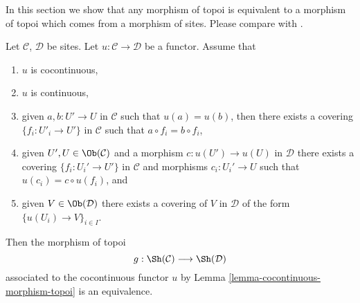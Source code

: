 \noindent
In this section we show that any morphism of topoi is equivalent
to a morphism of topoi which comes from a morphism of sites.
Please compare with \cite[Expos\'e IV, Proposition 4.9.4]{SGA4}.

\begin{lemma}
\label{lemma-equivalence}
Let $\mathcal{C}$, $\mathcal{D}$ be sites.
Let $u : \mathcal{C} \to \mathcal{D}$ be a functor.
Assume that
\begin{enumerate}
\item $u$ is cocontinuous,
\item $u$ is continuous,
\item given $a, b : U' \to U$ in $\mathcal{C}$ such that
$u(a) = u(b)$, then there exists a covering $\{f_i : U'_i \to U'\}$
in $\mathcal{C}$ such that $a \circ f_i = b \circ f_i$,
\item given $U', U \in \Ob(\mathcal{C})$ and
a morphism $c : u(U') \to u(U)$ in $\mathcal{D}$ there exists
a covering $\{f_i : U_i' \to U'\}$ in $\mathcal{C}$
and morphisms $c_i : U_i' \to U$ such that $u(c_i) = c \circ u(f_i)$, and
\item given $V \in \Ob(\mathcal{D})$ there exists a covering
of $V$ in $\mathcal{D}$ of the form $\{u(U_i) \to V\}_{i \in I}$.
\end{enumerate}
Then the morphism of topoi
$$
g : \Sh(\mathcal{C}) \longrightarrow \Sh(\mathcal{D})
$$
associated to the cocontinuous functor $u$ by
Lemma \ref{lemma-cocontinuous-morphism-topoi}
is an equivalence.
\end{lemma}

